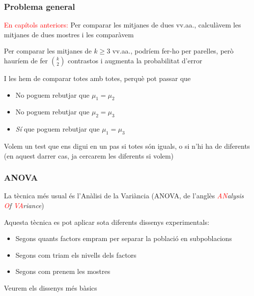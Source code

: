 \documentclass[12pt,t]{beamer}
\newcommand{\red}[1]{\textcolor{red}{#1}}
\renewcommand{\emph}[1]{{\color{red}#1}}
\renewcommand{\geq}{\geqslant}
\theoremstyle{plain}
\theoremstyle{definition}
\begin{document}
\begin{frame}
\frametitle{Problema general}

\red{En capítols anteriors:} Per comparar les mitjanes de dues vv.aa.,  calculàvem les mitjanes de dues mostres i les comparàvem
\medskip

Per comparar les mitjanes de $k\geq 3$ vv.aa., podríem fer-ho per parelles, però hauríem de fer $\binom{k}{2}$ contrastos i augmenta la probabilitat d'error
\medskip

I les hem de comparar totes amb totes, perquè pot passar que
\begin{itemize}
\item No poguem rebutjar que $\mu_1= \mu_2$
\item No poguem rebutjar que $\mu_2= \mu_3$
\item \textit{Sí} que poguem rebutjar que $\mu_1= \mu_3$
\end{itemize}
\medskip

Volem un test que ens digui en un pas si totes són iguals, o si n'hi ha de diferents (en aquest darrer cas, ja cercarem les diferents si volem)
\end{frame}


\begin{frame}
\frametitle{ANOVA}

La tècnica més usual és l'\emph{Anàlisi de la Variància} (\emph{ANOVA}, de l'anglès \textsl{\red{AN}alysis \red{O}f \red{VA}riance})
\bigskip

Aquesta tècnica es pot aplicar sota diferents dissenys experimentals:\medskip

\begin{itemize}
\item Segons quants factors empram per separar la població en subpoblacions
\medskip

\item Segons com triam els nivells dels factors
\medskip

\item Segons com prenem les mostres
\end{itemize}
\medskip

Veurem els dissenys més bàsics



\end{frame}
\end{document}
